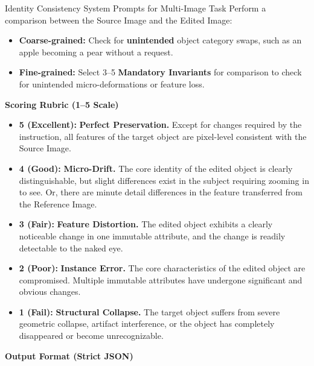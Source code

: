 \documentclass{llmxive}
\begin{document}
\begin{promptbox}[label={System Prompts: IC_Multi-Image}]{Identity Consistency System Prompts for Multi-Image Task}
Perform a comparison between the Source Image and the Edited Image:

\begin{itemize}[leftmargin=2.2em, labelsep=0.5em, itemsep=2pt]
    \item \textbf{Coarse-grained:} Check for \textbf{unintended} object category swaps, such as an apple becoming a pear without a request.
    
    \item \textbf{Fine-grained:} Select 3--5 \textbf{Mandatory Invariants} for comparison to check for unintended micro-deformations or feature loss.
\end{itemize}

\medskip

\textbf{Scoring Rubric (1--5 Scale)}

\begin{itemize}[leftmargin=2.2em, labelsep=0.5em, itemsep=2pt]
    \item \textbf{5 (Excellent):} \textbf{Perfect Preservation.} Except for changes required by the instruction, all features of the target object are pixel-level consistent with the Source Image.
    
    \item \textbf{4 (Good):} \textbf{Micro-Drift.} The core identity of the edited object is clearly distinguishable, but slight differences exist in the subject requiring zooming in to see. Or, there are minute detail differences in the feature transferred from the Reference Image.
    
    \item \textbf{3 (Fair):} \textbf{Feature Distortion.} The edited object exhibits a clearly noticeable change in one immutable attribute, and the change is readily detectable to the naked eye.
    
    \item \textbf{2 (Poor):} \textbf{Instance Error.} The core characteristics of the edited object are compromised. Multiple immutable attributes have undergone significant and obvious changes.
    
    \item \textbf{1 (Fail):} \textbf{Structural Collapse.} The target object suffers from severe geometric collapse, artifact interference, or the object has completely disappeared or become unrecognizable.
\end{itemize}

\medskip

\textbf{Output Format (Strict JSON)}


\end{promptbox}
\end{document}
